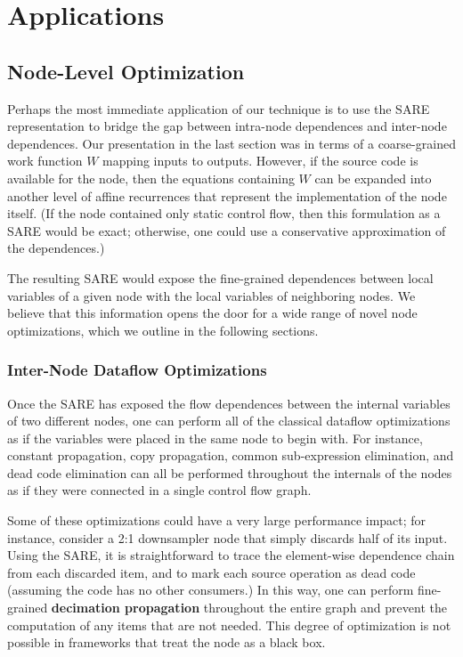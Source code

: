 \section{Applications}

\subsection{Node-Level Optimization}

Perhaps the most immediate application of our technique is to use the
SARE representation to bridge the gap between intra-node dependences
and inter-node dependences.  Our presentation in the last section was
in terms of a coarse-grained work function $W$ mapping inputs to
outputs.  However, if the source code is available for the node, then
the equations containing $W$ can be expanded into another level of
affine recurrences that represent the implementation of the node
itself.  (If the node contained only static control flow, then this
formulation as a SARE would be exact; otherwise, one could use a
conservative approximation of the dependences.)

The resulting SARE would expose the fine-grained dependences between
local variables of a given node with the local variables of
neighboring nodes.  We believe that this information opens the door
for a wide range of novel node optimizations, which we outline in the
following sections.

\subsubsection{Inter-Node Dataflow Optimizations}

Once the SARE has exposed the flow dependences between the internal
variables of two different nodes, one can perform all of the classical
dataflow optimizations as if the variables were placed in the same
node to begin with.  For instance, constant propagation, copy
propagation, common sub-expression elimination, and dead code
elimination can all be performed throughout the internals of the nodes
as if they were connected in a single control flow graph.

Some of these optimizations could have a very large performance
impact; for instance, consider a 2:1 downsampler node that simply
discards half of its input.  Using the SARE, it is straightforward to
trace the element-wise dependence chain from each discarded item, and
to mark each source operation as dead code (assuming the code has no
other consumers.)  In this way, one can perform fine-grained {\bf
decimation propagation} throughout the entire graph and prevent the
computation of any items that are not needed.  This degree of
optimization is not possible in frameworks that treat the node as a
black box.


